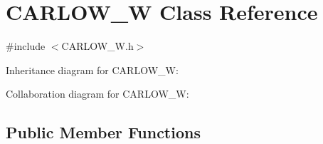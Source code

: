 \hypertarget{class_c_a_r_l_o_w___w}{}\section{C\+A\+R\+L\+O\+W\+\_\+W Class Reference}
\label{class_c_a_r_l_o_w___w}


{\ttfamily \#include $<$C\+A\+R\+L\+O\+W\+\_\+\+W.\+h$>$}



Inheritance diagram for C\+A\+R\+L\+O\+W\+\_\+W\+:


Collaboration diagram for C\+A\+R\+L\+O\+W\+\_\+W\+:
\subsection*{Public Member Functions}
